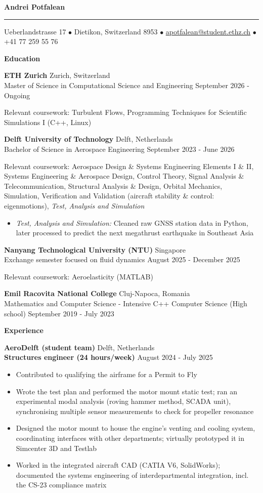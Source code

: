 \documentclass[11pt]{article}
\newcommand{\cvsection}[1]{%
  \vspace{12pt}%
  \centerline{\textbf{#1}}%
  \vspace{8pt}%
}
\newcommand{\cventry}[4]{%
  \textbf{#1} \hfill #2 \\
  #3 \hfill #4\par
}
\newcommand{\cvrole}[4]{%
  \textbf{#1} \hfill #2 \\
  \textbf{#3} \hfill #4\par
}
\newcommand{\cvgap}{\vspace{0.7em}}
\begin{document}
\begin{center}
  {\LARGE\textbf{Andrei Potfalean}}
\end{center}
\vspace{0.8pt}
\hrule
\vspace{12pt}
\centerline{Ueberlandstrasse 17 $\bullet$ Dietikon, Switzerland 8953 $\bullet$
  \href{mailto:apotfalean@student.ethz.ch}{apotfalean@student.ethz.ch} $\bullet$ +41 77 259 55 76}

\cvsection{Education}

\cventry{ETH Zurich}{Zurich, Switzerland}
  {Master of Science in Computational Science and Engineering}{September 2026 - Ongoing}
Relevant coursework: Turbulent Flows, Programming Techniques for Scientific Simulations I (C++, Linux)
\cvgap

\cventry{Delft University of Technology}{Delft, Netherlands}
  {Bachelor of Science in Aerospace Engineering}{September 2023 - June 2026}
Relevant coursework: Aerospace Design \& Systems Engineering Elements I \& II, Systems Engineering \& Aerospace Design, Control Theory, Signal Analysis \& Telecommunication, Structural Analysis \& Design, Orbital Mechanics, Simulation, Verification and Validation (aircraft stability \& control: eigenmotions), \textit{Test, Analysis and Simulation}
\begin{itemize}
  \item \textit{Test, Analysis and Simulation:} Cleaned raw GNSS station data in Python, later processed to predict the next megathrust earthquake in Southeast Asia
\end{itemize}
\cvgap

\cventry{Nanyang Technological University (NTU)}{Singapore}
  {Exchange semester focused on fluid dynamics}{August 2025 - December 2025}
Relevant coursework: Aeroelasticity (MATLAB)
\cvgap

\cventry{Emil Racovita National College}{Cluj-Napoca, Romania}
  {Mathematics and Computer Science - Intensive C++ Computer Science (High school)}{September 2019 - July 2023}

\cvsection{Experience}

\cvrole{AeroDelft (student team)}{Delft, Netherlands}{Structures engineer (24 hours/week)}{August 2024 - July 2025}
\begin{itemize}
  \item Contributed to qualifying the airframe for a Permit to Fly
  \item Wrote the test plan and performed the motor mount static test; ran an experimental modal analysis (roving hammer method, SCADA unit), synchronising multiple sensor measurements to check for propeller resonance
  \item Designed the motor mount to house the engine's venting and cooling system, coordinating interfaces with other departments; virtually prototyped it in Simcenter 3D and Testlab
  \item Worked in the integrated aircraft CAD (CATIA V6, SolidWorks); documented the systems engineering of interdepartmental integration, incl. the CS-23 compliance matrix
\end{itemize}
\cvgap
\end{document}
